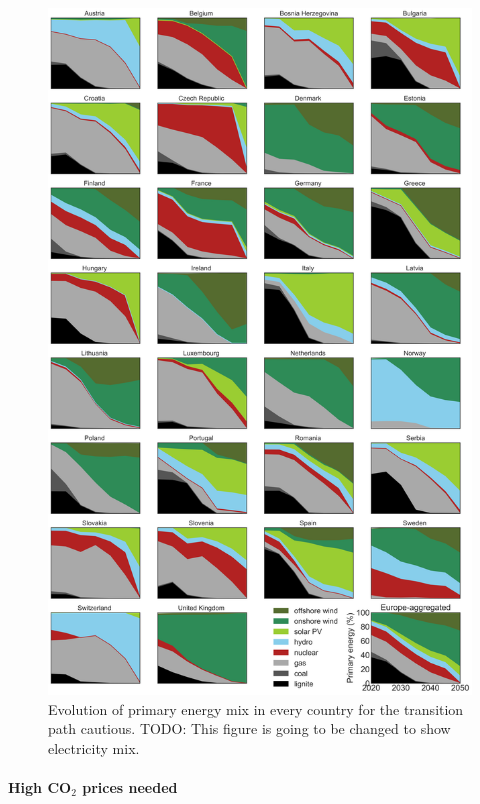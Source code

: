 \documentclass[5p]{elsarticle} %
\begin{document}
\begin{figure}[!h]
\centering
\includegraphics[width=14cm]{figures/primary_energy_go.png}
\caption{Evolution of primary energy mix in every country for the transition path cautious. \textcolor[rgb]{1,0,0}{TODO: This figure is going to be changed to show electricity mix. }} \label{fig_primary_energy} 
\end{figure}

\paragraph{\textbf{High CO$_2$ prices needed}} \
\end{document}
